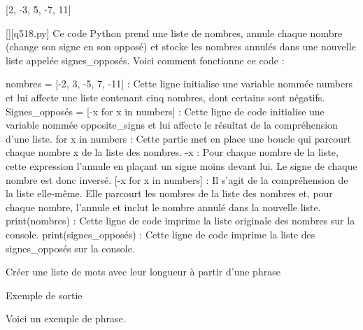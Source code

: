 [2, -3, 5, -7, 11]
        \par
        \begin{solution}
            \renewcommand{\nomfichier}{q518.py}
            \pythonfile{\chemincode \nomfichier}[][\nomfichier]
            Ce code Python prend une liste de nombres, annule chaque nombre (change son signe en son opposé) et stocke les nombres annulés dans une nouvelle liste appelée signes_opposés. Voici comment fonctionne ce code :

    nombres = [-2, 3, -5, 7, -11] : Cette ligne initialise une variable nommée numbers et lui affecte une liste contenant cinq nombres, dont certains sont négatifs.
    Signes_opposés = [-x for x in numbers] : Cette ligne de code initialise une variable nommée opposite_signs et lui affecte le résultat de la compréhension d'une liste.
        for x in numbers : Cette partie met en place une boucle qui parcourt chaque nombre x de la liste des nombres.
        -x : Pour chaque nombre de la liste, cette expression l'annule en plaçant un signe moins devant lui. Le signe de chaque nombre est donc inversé.
        [-x for x in numbers] : Il s'agit de la compréhension de la liste elle-même. Elle parcourt les nombres de la liste des nombres et, pour chaque nombre, l'annule et inclut le nombre annulé dans la nouvelle liste.
    print(nombres) : Cette ligne de code imprime la liste originale des nombres sur la console.
    print(signes_opposés) : Cette ligne de code imprime la liste des signes_opposés sur la console.
        \end{solution}
        

        \question
        Créer une liste de mots avec leur longueur à partir d'une phrase

Exemple de sortie

Voici un exemple de phrase.

